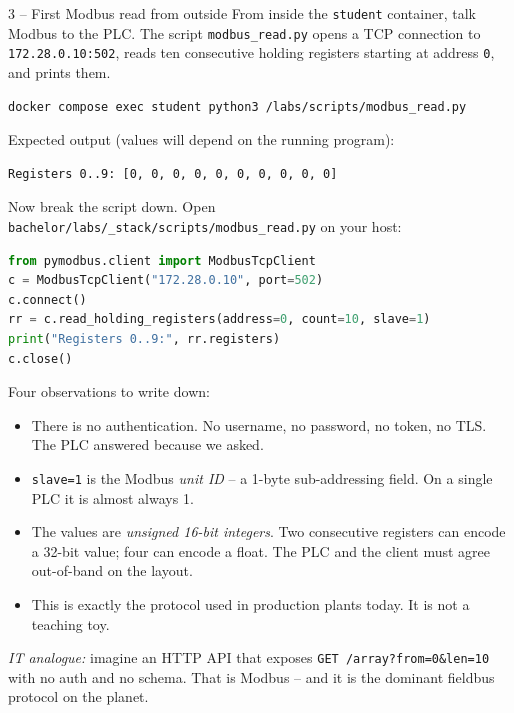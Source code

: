 \documentclass[11pt,a4paper]{article}
\begin{document}
\begin{stepbox}{3 -- First Modbus read from outside}
From inside the \texttt{student} container, talk Modbus to the PLC.
The script \texttt{modbus\_read.py} opens a TCP connection to
\texttt{172.28.0.10:502}, reads ten consecutive holding registers
starting at address \texttt{0}, and prints them.

\begin{lstlisting}[language=bash]
docker compose exec student python3 /labs/scripts/modbus_read.py
\end{lstlisting}

Expected output (values will depend on the running program):

\begin{lstlisting}
Registers 0..9: [0, 0, 0, 0, 0, 0, 0, 0, 0, 0]
\end{lstlisting}

Now break the script down. Open
\texttt{bachelor/labs/\_stack/scripts/modbus\_read.py} on your host:

\begin{lstlisting}[language=Python]
from pymodbus.client import ModbusTcpClient
c = ModbusTcpClient("172.28.0.10", port=502)
c.connect()
rr = c.read_holding_registers(address=0, count=10, slave=1)
print("Registers 0..9:", rr.registers)
c.close()
\end{lstlisting}

Four observations to write down:

\begin{itemize}\setlength{\itemsep}{1pt}
  \item There is no authentication. No username, no password, no
        token, no TLS. The PLC answered because we asked.
  \item \texttt{slave=1} is the Modbus \emph{unit ID} -- a 1-byte
        sub-addressing field. On a single PLC it is almost always 1.
  \item The values are \emph{unsigned 16-bit integers}. Two consecutive
        registers can encode a 32-bit value; four can encode a float.
        The PLC and the client must agree out-of-band on the layout.
  \item This is exactly the protocol used in production plants today.
        It is not a teaching toy.
\end{itemize}

\emph{IT analogue:} imagine an HTTP API that exposes
\texttt{GET /array?from=0\&len=10} with no auth and no schema. That is
Modbus -- and it is the dominant fieldbus protocol on the planet.
\end{stepbox}
\end{document}
